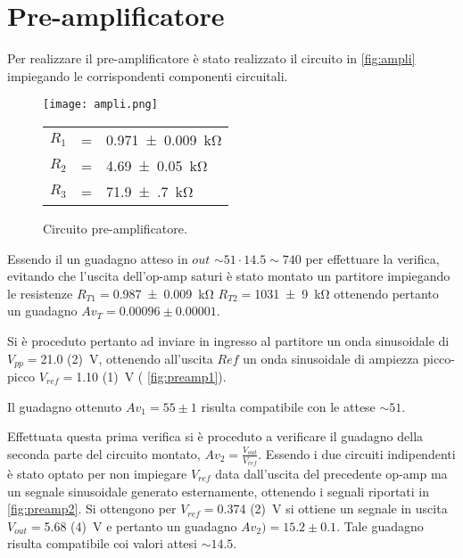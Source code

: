 \section{Pre-amplificatore}
	Per realizzare il pre-amplificatore è stato realizzato il circuito in 
	\figurename{ \ref{fig:ampli}} impiegando le corrispondenti componenti
	circuitali.
	
		\begin{figure}[h]
		\begin{minipage}{0.75\textwidth}
			\centering
			\texttt{[image: ampli.png]}
			\caption{Circuito pre-amplificatore.}
			\label{fig:pre}
		\end{minipage}
		\begin{minipage}{0.19\textwidth}
			\begin{tabular}{l@{ }c@{ }l}
				$R_{1}$& = &\SI{0.971(9)}{\kilo\ohm}\\
				$R_{2}$& = &\SI{4.69(5)}{\kilo\ohm}\\
				$R_3$& = &\SI{71.9(7)}{\kilo\ohm}\\
			\end{tabular}
		\end{minipage}
	\end{figure}
	Essendo il un guadagno atteso in $out$ $\sim 51 \cdot 14.5 \sim 740$ per effettuare
	la verifica, evitando che l'uscita dell'op-amp saturi è stato montato un partitore impiegando le resistenze $R_{T1}=$\SI{0.987(9)}{\kilo\ohm} $R_{T2}=$\SI{1031(9)}{\kilo\ohm}
	ottenendo pertanto un guadagno  $Av_{T}=0.00096 \pm 0.00001$.
	
	Si è proceduto pertanto ad inviare in ingresso al partitore un onda sinusoidale di 
	$V_{pp}=$\SI{21.0 (2)}{\volt}, ottenendo all'uscita $Ref$ un onda sinusoidale di ampiezza
	picco-picco $V_{ref}=$\SI{1.10 (1)}{\volt} (\figurename{ \ref{fig:preamp1}}).
	
		
	Il guadagno ottenuto $Av_{1}= 55 \pm 1$ risulta compatibile con le attese $\sim 51$.
	
	Effettuata questa prima verifica si è proceduto a verificare il guadagno della seconda
	parte del circuito montato, $Av_{2}= \frac{V_{out}}{V_{ref}}$.
	Essendo i due circuiti indipendenti è stato optato per non impiegare $V_{ref}$ data dall'uscita 
	del precedente op-amp
	ma un segnale sinusoidale generato esternamente, ottenendo i segnali riportati in
	\figurename{ \ref{fig:preamp2}}.
	Si ottengono per $V_{ref}=$\SI{0.374 (2)}{\volt} si ottiene un segnale in uscita
	$V_{out}=$\SI{5.68 (4)}{\volt} e pertanto un guadagno $Av_{2})=15.2 \pm 0.1$.
	Tale guadagno risulta compatibile coi valori attesi $\sim 14.5$.
	
